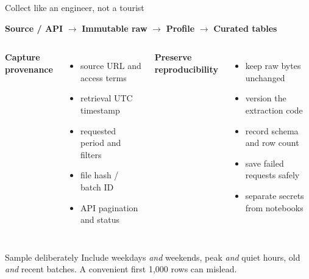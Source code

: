 \documentclass[aspectratio=43,10pt]{beamer}
\begin{document}
\begin{frame}{Collect like an engineer, not a tourist}
\begin{center}
\colorbox{gray!25}{\parbox{\linewidth}{\centering
\textbf{Source / API} $\longrightarrow$ \textbf{Immutable raw} $\longrightarrow$ \textbf{Profile} $\longrightarrow$ \textbf{Curated tables}}}
\end{center}

\vspace{0.5em}
\begin{columns}[T]
\textbf{Capture provenance}
\begin{itemize}
\item source URL and access terms
\item retrieval UTC timestamp
\item requested period and filters
\item file hash / batch ID
\item API pagination and status
\end{itemize}
\textbf{Preserve reproducibility}
\begin{itemize}
\item keep raw bytes unchanged
\item version the extraction code
\item record schema and row count
\item save failed requests safely
\item separate secrets from notebooks
\end{itemize}
\end{columns}

\begin{block}{Sample deliberately}
Include weekdays \emph{and} weekends, peak \emph{and} quiet hours, old \emph{and} recent batches. A convenient first 1,000 rows can mislead.
\end{block}
\end{frame}
\end{document}
